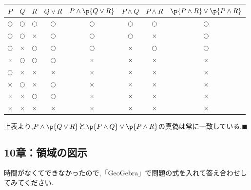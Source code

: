 \documentclass[10pt,fleqn,a4paper]{jsarticle}
\begin{document}
\begin{center}
  \begin{tabular}{|c|c|c||c|c||c|c||c|}
    \hline
    $P$& $Q$& $R$& $Q\vee R$& $P\wedge\p{Q\vee R}$&$P\wedge Q$&$P\wedge R$&$\p{P\wedge R}\vee\p{P\wedge R}$\\
    \hline
    $\bigcirc$&$\bigcirc$&$\bigcirc$&$\bigcirc$&$\bigcirc$&$\bigcirc$&$\bigcirc$&$\bigcirc$\\
    \hline
    $\bigcirc$&$\bigcirc$&$\times$&$\bigcirc$&$\bigcirc$&$\bigcirc$&$\times$&$\bigcirc$\\
    \hline
    $\bigcirc$&$\times$&$\bigcirc$&$\bigcirc$&$\bigcirc$&$\times$&$\bigcirc$&$\bigcirc$\\
    \hline
    $\times$&$\bigcirc$&$\bigcirc$&$\bigcirc$&$\times$&$\times$&$\times$&$\times$\\
    \hline
    $\bigcirc$&$\times$&$\times$&$\times$&$\times$&$\times$&$\times$&$\times$\\
    \hline
    $\times$&$\bigcirc$&$\times$&$\bigcirc$&$\times$&$\times$&$\times$&$\times$\\
    \hline
    $\times$&$\times$&$\bigcirc$&$\bigcirc$&$\times$&$\times$&$\times$&$\times$\\
    \hline
    $\times$&$\times$&$\times$&$\times$&$\times$&$\times$&$\times$&$\times$\\
    \hline
  \end{tabular}
\end{center}
上表より,$P\wedge\p{Q\vee R}$と$\p{P\wedge Q}\vee \p{P\wedge R}$の真偽は常に一致している.\hspace{2mm}$\blacksquare$
\newpage
\subsection{10章：領域の図示}
時間がなくてできなかったので,「GeoGebra」で問題の式を入れて答え合わせしてみてください.
\newpage
\end{document}
